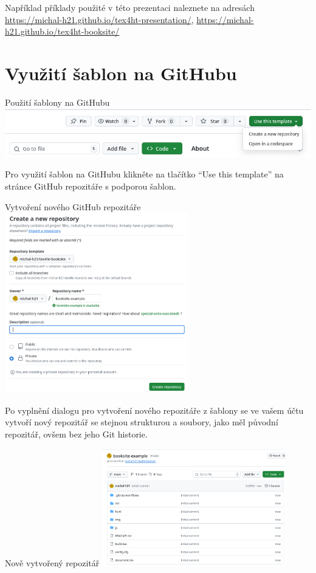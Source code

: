 Například příklady použité v této prezentaci naleznete na adresách \url{https://michal-h21.github.io/tex4ht-presentation/},
\url{https://michal-h21.github.io/tex4ht-booksite/}

\section{Využití šablon na GitHubu}
\begin{frame}[fragile]{Použití šablony na GitHubu}
  \includegraphics[width=\textwidth,alt={}]{img/template-use.png}
\end{frame}

Pro využití šablon na GitHubu klikněte na tlačítko
\enquote{Use this template} na stránce GitHub repozitáře s podporou šablon. 


\begin{frame}[fragile]{Vytvoření nového GitHub repozitáře}
  \includegraphics[width=0.6\textwidth,alt={Dialog vytvoření nového repozitáře ze šablony}]{img/new-repo.png}
\end{frame}

Po vyplnění dialogu pro vytvoření nového repozitáře z šablony se ve vašem účtu vytvoří
nový repozitář se stejnou strukturou a soubory, jako měl původní repozitář, ovšem bez jeho 
Git historie.

\begin{frame}[fragile]{Nově vytvořený repozitář}
\includegraphics[width=0.6\textwidth]{img/created-repo.png}
\end{frame}


